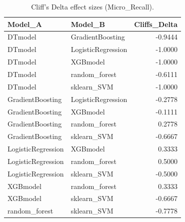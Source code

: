 \begin{table}[t]
\centering
\begin{tabular}{llr}
\toprule
Model_A & Model_B & Cliffs_Delta \\
\midrule
DTmodel & GradientBoosting & -0.9444 \\
DTmodel & LogisticRegression & -1.0000 \\
DTmodel & XGBmodel & -1.0000 \\
DTmodel & random_forest & -0.6111 \\
DTmodel & sklearn_SVM & -1.0000 \\
GradientBoosting & LogisticRegression & -0.2778 \\
GradientBoosting & XGBmodel & -0.1111 \\
GradientBoosting & random_forest & 0.2778 \\
GradientBoosting & sklearn_SVM & -0.6667 \\
LogisticRegression & XGBmodel & 0.3333 \\
LogisticRegression & random_forest & 0.5000 \\
LogisticRegression & sklearn_SVM & -0.5000 \\
XGBmodel & random_forest & 0.3333 \\
XGBmodel & sklearn_SVM & -0.6667 \\
random_forest & sklearn_SVM & -0.7778 \\
\bottomrule
\end{tabular}
\caption{Cliff's Delta effect sizes (Micro_Recall).}
\label{tab:cliffs_Micro_Recall}
\end{table}